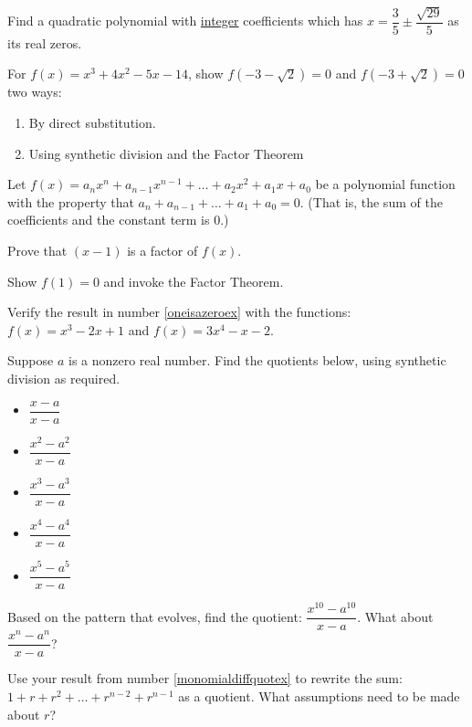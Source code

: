 \documentclass{ximera}
\begin{document}
\begin{problem}
Find a quadratic polynomial with \underline{integer} coefficients which has $x = \dfrac{3}{5} \pm \dfrac{\sqrt{29}}{5}$ as its real zeros. 
\end{problem}

\begin{problem}\label{verifyrootsex}

For $f(x) = x^3 + 4x^2-5x-14$, show $f(-3-\sqrt{2}) = 0$ and $f(-3+\sqrt{2}) = 0$ two ways:

\begin{enumerate}

\item  By direct substitution.

\item  Using synthetic division and the Factor Theorem

\end{enumerate}
\end{problem}

\begin{problem}\label{oneisazeroex}
Let $f(x) = a_{n} x^{n} + a_{n-1} x^{n-1} + \ldots + a_{2} x^{2} + a_{1} x + a_{0}$ be a polynomial function with the property that $ a_{n}+a_{n-1} + \ldots + a_{1} + a_{0} = 0$.  (That is, the sum of the coefficients and the constant term is $0$.)  

Prove that $(x-1)$ is a factor of $f(x)$.

\begin{hint}
Show $f(1) = 0$ and invoke the Factor Theorem.
\end{hint}
\end{problem}

\begin{problem}
Verify the result in number \ref{oneisazeroex} with the functions: $f(x) = x^3 - 2x + 1$ and  $f(x) = 3x^4-x-2$.    
\end{problem}

\begin{problem}\label{monomialdiffquotex} 
Suppose $a$ is a nonzero real number.  Find the quotients below, using synthetic division as required. 

\begin{itemize}
    \item $\dfrac{x - a}{x-a}$
    \item $\dfrac{x^2 - a^2}{x-a}$ 
    \item $\dfrac{x^3 - a^3}{x-a}$ 
    \item $\dfrac{x^4 - a^4}{x-a}$ 
    \item $\dfrac{x^5 - a^5}{x-a}$ 
\end{itemize}

Based on the pattern that evolves, find the quotient: $\dfrac{x^{10} - a^{10}}{x-a}$.  What about  $\dfrac{x^{n} - a^{n}}{x-a}$?
\end{problem}

\begin{problem}\label{geoseriespreview}
Use your result from number \ref{monomialdiffquotex} to rewrite the sum: $1 + r + r^2 + \dots + r^{n-2} + r^{n-1}$ as a quotient. What assumptions need to be made about $r$?
\end{problem}
\end{document}
